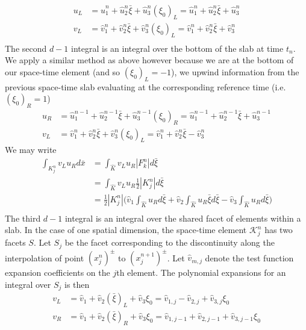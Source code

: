 \documentclass[11pt, oneside]{article}   	%
\begin{document}
\[\begin{split}
u_L &= \hat{u}_1^n + \hat{u}_2^n\bar{\xi} + \hat{u}_3^n (\xi_0)_L = \hat{u}_1^n + \hat{u}_2^n\bar{\xi} + \hat{u}_3^n\\
v_L &= \hat{v}_1^n + \hat{v}_2^n \bar{\xi} + \hat{v}_3^n (\xi_0)_L = \hat{v}_1^n + \hat{v}_2^n\bar{\xi} + \hat{v}_3^n\\
\end{split}\]
The second $d-1$ integral is an integral over the bottom of the slab at time $t_n$.
We apply a similar method as above however because we are at the bottom of our space-time element (and so $(\xi_0)_L = -1$), we upwind information from the previous space-time slab evaluating at the corresponding reference time (i.e. $(\xi_0)_R = 1$)
\[\begin{split}
u_R &= \hat{u}_1^{n-1} + \hat{u}_2^{n-1}\bar{\xi} + \hat{u}_3^{n-1}(\xi_0)_R = \hat{u}_1^{n-1} + \hat{u}_2^{n-1}\bar{\xi} + \hat{u}_3^{n-1}\\
v_L &= \hat{v}_1^n + \hat{v}_2^n \bar{\xi} + \hat{v}_3^n (\xi_0)_L = \hat{v}_1^n + \hat{v}_2^n \bar{\xi} - \hat{v}_3^n
\end{split}\]
We may write
\begin{equation}\label{Kn_integral}
\begin{split}
\int_{K_j^n}v_L u_R d\bar{x} &= \int_{\hat{K}}v_L u_R |F_k^n|d\bar{\xi}\\
&= \int_{\hat{K}}v_L u_R \frac{1}{2}|K_j^n|d\bar{\xi}\\
&= \frac{1}{2}|K_j^n| \big( \hat{v}_1 \int_{\hat{K}}u_R d\bar{\xi} + \hat{v}_2 \int_{\hat{K}}u_R\bar{\xi}d\bar{\xi} - \hat{v}_3 \int_{\hat{K}}u_R d\bar{\xi}\big)\\
\end{split}
\end{equation}
The third $d-1$ integral is an integral over the shared facet of elements within a slab.
In the case of one spatial dimension, the space-time element $\mathcal{K}_j^n$ has two facets $S$.
Let $S_j$ be the facet corresponding to the discontinuity along the interpolation of point $(x_j^n)^\pm$ to $(x_j^{n+1})^\pm$.
Let $\hat{v}_{m,j}$ denote the test function expansion coefficients on the $j$th element.
The polynomial expansions for an integral over $S_j$ is then
\[\begin{split}
v_L &= \hat{v}_1 + \hat{v}_2 (\bar{\xi})_L + \hat{v}_3 \xi_0 = \hat{v}_{1,j} - \hat{v}_{2,j} + \hat{v}_{3,j} \xi_0\\
v_R &= \hat{v}_1 + \hat{v}_2 (\bar{\xi})_R + \hat{v}_3 \xi_0 = \hat{v}_{1,j-1} + \hat{v}_{2,j-1} + \hat{v}_{3,j-1} \xi_0\\
\end{split}\]
\end{document}
